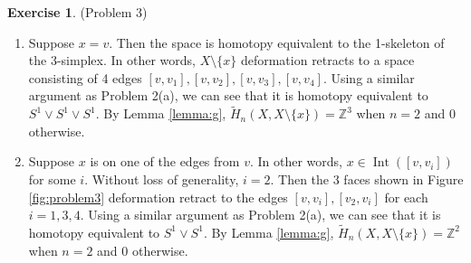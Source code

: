 \documentclass[12pt, psamsfonts]{amsart}
\theoremstyle{definition}
\newtheorem*{exer}{Exercise}
\theoremstyle{remark}
\DeclareMathOperator{\Int}{Int}
\numberwithin{equation}{section}
\begin{document}
\begin{exer}{(Problem 3)}
\begin{enumerate}
    \item
      Suppose $x = v$.
      Then the space is homotopy equivalent to the 1-skeleton of the 3-simplex.
      In other words, $X \setminus \{ x \}$ deformation retracts to a space consisting of 4 edges $[v, v_1], [v, v_2], [v, v_3], [v, v_4]$.
      Using a similar argument as Problem 2(a), we can see that it is homotopy equivalent to $S^1 \vee S^1 \vee S^1$.
      By Lemma \ref{lemma:g}, $\tilde{H}_n(X, X \setminus \{ x \}) = \mathbb{Z}^3$ when $n = 2$ and 0 otherwise.
    \item
      Suppose $x$ is on one of the edges from $v$.
      In other words, $x \in \Int([v, v_i])$ for some $i$.
      Without loss of generality, $i = 2$.
      Then the 3 faces shown in Figure \ref{fig:problem3} deformation retract to the edges $[v, v_i], [v_2, v_i]$ for each $i = 1, 3, 4$.
      Using a similar argument as Problem 2(a), we can see that it is homotopy equivalent to $S^1 \vee S^1$.
      By Lemma \ref{lemma:g}, $\tilde{H}_n(X, X \setminus \{ x \}) = \mathbb{Z}^2$ when $n = 2$ and 0 otherwise.
  \end{enumerate}
\end{exer}
\end{document}
